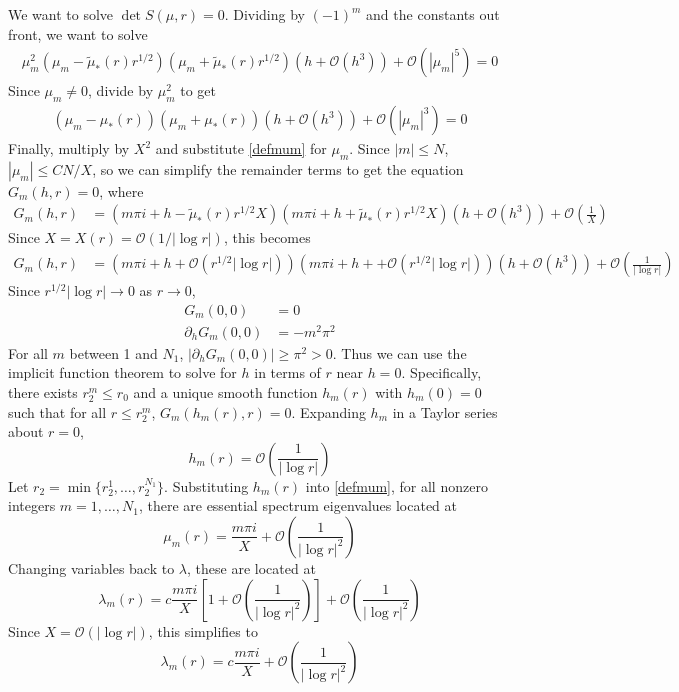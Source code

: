 \documentclass[thesis.tex]{subfiles}
\begin{document}
We want to solve $\det S(\mu, r) = 0$. Dividing by $(-1)^m$ and the constants out front, we want to solve 
\begin{equation}\label{Bess2}
\begin{aligned}
\mu_m^2 (\mu_m - \tilde{\mu}_*(r)r^{1/2})(\mu_m + \tilde{\mu}_*(r)r^{1/2}) \left( h + \mathcal{O}(h^3) \right) + \mathcal{O}\left( |\mu_m|^5 \right) = 0
\end{aligned}
\end{equation}
Since $\mu_m \neq 0$, divide by $\mu_m^2$ to get
\begin{equation}\label{Bess3}
\begin{aligned}
(\mu_m - \mu_*(r))(\mu_m + \mu_*(r)) \left( h + \mathcal{O}(h^3) \right) + \mathcal{O}\left( |\mu_m|^3 \right) = 0
\end{aligned}
\end{equation}
Finally, multiply by $X^2$ and substitute \cref{defmum} for $\mu_m$. Since $|m| \leq N$, $|\mu_m| \leq C N/X$, so we can simplify the remainder terms to get the equation $G_m(h, r) = 0$, where
\begin{equation}\label{Bess4}
\begin{aligned}
G_m(h, r) &= \left(m \pi i + h - \tilde{\mu}_*(r) r^{1/2} X\right)\left(m \pi i + h + \tilde{\mu}_*(r) r^{1/2} X \right) \left( h + \mathcal{O}(h^3) \right) + \mathcal{O}\left( \frac{1}{X} \right)
\end{aligned}
\end{equation}
Since $X = X(r) = \mathcal{O}(1/|\log r|)$, this becomes
\begin{equation}\label{Bess5}
\begin{aligned}
G_m(h, r) &= \left( m \pi i + h + \mathcal{O}(r^{1/2}|\log r|) \right)\left(m \pi i + h + + \mathcal{O}(r^{1/2}|\log r|) \right) \left( h + \mathcal{O}(h^3) \right) + \mathcal{O}\left( \frac{1}{|\log r|} \right)
\end{aligned}
\end{equation}
Since $r^{1/2}|\log r| \rightarrow 0$ as $r \rightarrow 0$,
\begin{align*}
G_m(0,0) &= 0 \\
\partial_h G_m(0,0) &= -m^2 \pi^2
\end{align*}
For all $m$ between 1 and $N_1$, $|\partial_h G_m(0,0)| \geq \pi^2 > 0$. Thus we can use the implicit function theorem to solve for $h$ in terms of $r$ near $h = 0$. Specifically, there exists $r_2^m \leq r_0$ and a unique smooth function $h_m(r)$ with $h_m(0) = 0$ such that for all $r \leq r_2^m$, $G_m(h_m(r),r) = 0$. Expanding $h_m$ in a Taylor series about $r = 0$,
\[
h_m(r) = \mathcal{O}\left( \frac{1}{|\log r|} \right)
\]
Let $r_2 = \min\{ r_2^1, \dots, r_2^{N_1} \}$. Substituting $h_m(r)$ into \cref{defmum}, for all nonzero integers $m = 1, \dots, N_1$, there are essential spectrum eigenvalues located at
\[
\mu_m(r) = \frac{m \pi i}{X} + \mathcal{O}\left( \frac{1}{|\log r|^2} \right)
\]
Changing variables back to $\lambda$, these are located at
\[
\lambda_m(r) = c \frac{m \pi i}{X}\left[1 + \mathcal{O}\left( \frac{1}{|\log r|^2} \right) \right] +\mathcal{O}\left( \frac{1}{|\log r|^2} \right)
\]
Since $X = \mathcal{O}(|\log r|)$, this simplifies to
\[
\lambda_m(r) = c \frac{m \pi i}{X} +\mathcal{O}\left( \frac{1}{|\log r|^2} \right)
\]
\end{document}
